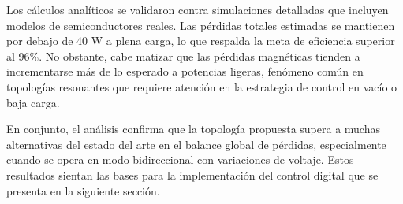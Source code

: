 Los cálculos analíticos se validaron contra simulaciones detalladas que incluyen modelos de semiconductores reales. Las pérdidas totales estimadas se mantienen por debajo de 40 W a plena carga, lo que respalda la meta de eficiencia superior al 96\%. No obstante, cabe matizar que las pérdidas magnéticas tienden a incrementarse más de lo esperado a potencias ligeras, fenómeno común en topologías resonantes que requiere atención en la estrategia de control en vacío o baja carga.

En conjunto, el análisis confirma que la topología propuesta supera a muchas alternativas del estado del arte en el balance global de pérdidas, especialmente cuando se opera en modo bidireccional con variaciones de voltaje. Estos resultados sientan las bases para la implementación del control digital que se presenta en la siguiente sección.